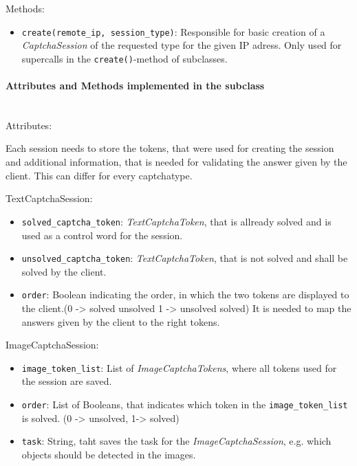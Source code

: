 Methods:

\begin{itemize} 
\item \verb|create(remote_ip, session_type)|: Responsible for basic creation of a \emph{CaptchaSession} of the requested type for the given IP adress. Only used for supercalls in the \verb|create()|-method of subclasses.
\end{itemize}


\paragraph{Attributes and Methods implemented in the subclass} \mbox{} \\


Attributes:


Each session needs to store the tokens, that were used for creating the session and additional information, that is needed for validating the answer given by the client. This can differ for every captchatype. 

TextCaptchaSession:

\begin{itemize} 
\item \verb|solved_captcha_token|: \emph{TextCaptchaToken}, that is allready solved and is used as a control word for the session.
\item \verb|unsolved_captcha_token|: \emph{TextCaptchaToken}, that is not solved and shall be solved by the client.
\item \verb|order|: Boolean indicating the order, in which the two tokens are displayed to the client.(0 -> solved unsolved 1 -> unsolved solved) It is needed to map the answers given by the client to the right tokens.
\end{itemize}


ImageCaptchaSession:

\begin{itemize}
\item \verb|image_token_list|: List of \emph{ImageCaptchaTokens}, where all tokens used for the session are saved.
\item \verb|order|: List of Booleans, that indicates which token in the \verb|image_token_list| is solved. (0 -> unsolved, 1-> solved)
\item \verb|task|: String, taht saves the task for the \emph{ImageCaptchaSession}, e.g. which objects should be detected in the images.
\end{itemize}

